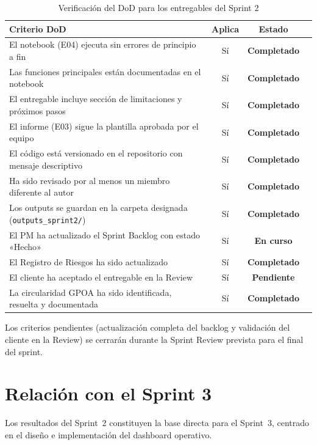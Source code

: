 \documentclass[12pt,a4paper]{article}
\newcommand{\done}{\textcolor{completed}{\textbf{Completado}}}
\newcommand{\pend}{\textcolor{pending}{\textbf{Pendiente}}}
\newcommand{\inpr}{\textcolor{inprogress}{\textbf{En curso}}}
\begin{document}
\begin{table}[H]
\centering
\caption{Verificación del DoD para los entregables del Sprint 2}
\label{tab:dod}
\renewcommand{\arraystretch}{1.4}
\begin{tabularx}{\textwidth}{Xccl}
\toprule
\textbf{Criterio DoD} & \textbf{Aplica} & \textbf{Estado} \\
\midrule
El notebook (E04) ejecuta sin errores de principio a fin         & Sí & \done \\
Las funciones principales están documentadas en el notebook      & Sí & \done \\
El entregable incluye sección de limitaciones y próximos pasos   & Sí & \done \\
El informe (E03) sigue la plantilla aprobada por el equipo       & Sí & \done \\
El código está versionado en el repositorio con mensaje descriptivo & Sí & \done \\
Ha sido revisado por al menos un miembro diferente al autor      & Sí & \done \\
Los outputs se guardan en la carpeta designada (\texttt{outputs\_sprint2/}) & Sí & \done \\
El PM ha actualizado el Sprint Backlog con estado «Hecho»        & Sí & \inpr \\
El Registro de Riesgos ha sido actualizado                       & Sí & \done \\
El cliente ha aceptado el entregable en la Review                & Sí & \pend \\
La circularidad GPOA ha sido identificada, resuelta y documentada & Sí & \done \\
\bottomrule
\end{tabularx}
\end{table}

Los criterios pendientes (actualización completa del backlog y validación del cliente en la Review) se cerrarán durante la Sprint Review prevista para el final del sprint.

\newpage
\section{Relación con el Sprint 3}

Los resultados del Sprint~2 constituyen la base directa para el Sprint~3, centrado en el diseño e implementación del dashboard operativo.
\end{document}

